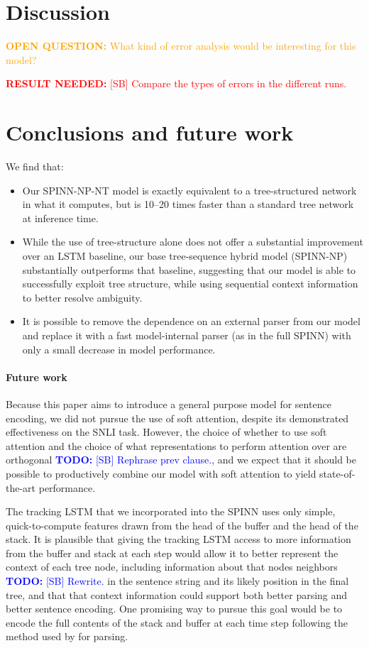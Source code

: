 \documentclass[11pt]{article}
\newcommand\todo[1]{\textcolor{blue}{\textbf{TODO:} #1}}
\newcommand\result[1]{\textcolor{red}{\textbf{RESULT NEEDED:} #1}}
\newcommand\question[1]{\textcolor{orange}{\textbf{OPEN QUESTION:} #1}}
\begin{document}
\section{Discussion}

\question{What kind of error analysis would be interesting for this model?}

\result{[SB] Compare the types of errors in the different runs.}

\vspace{10em}

\section{Conclusions and future work}

We find that:
\begin{itemize}
\item Our SPINN-NP-NT model is exactly equivalent to a tree-structured network in what it computes, but is 10--20 times faster than a standard tree network at inference time.
\item While the use of tree-structure alone does not offer a substantial improvement over an LSTM baseline, our base tree-sequence hybrid model (SPINN-NP) substantially outperforms that baseline, suggesting that our model is able to successfully exploit tree structure, while using sequential context information to better resolve ambiguity.
\item It is possible to remove the dependence on an external parser from our model and replace it with a fast model-internal parser (as in the full SPINN) with only a small decrease in model performance.
\end{itemize}

\paragraph{Future work} Because this paper aims to introduce a general purpose model for sentence encoding, we did not pursue the use of soft attention, despite its demonstrated effectiveness on the SNLI task. However, the choice of whether to use soft attention and the choice of what representations to perform attention over are orthogonal \todo{[SB] Rephrase prev clause.}, and we expect that it should be possible to productively combine our model with soft attention to yield state-of-the-art performance.

The tracking LSTM that we incorporated into the SPINN uses only simple, quick-to-compute features drawn from the head of the buffer and the head of the stack. It is plausible that giving the tracking LSTM access to more information from the buffer and stack at each step would allow it to better represent the context of each tree node, including information about that nodes neighbors \todo{[SB] Rewrite.} in the sentence string and its likely position in the final tree, and that that context information could support both better parsing and better sentence encoding. One promising way to pursue this goal would be to encode the full contents of the stack and buffer at each time step following the method used by \citet{dyer-EtAl:2015:ACL-IJCNLP} for parsing.
\end{document}
